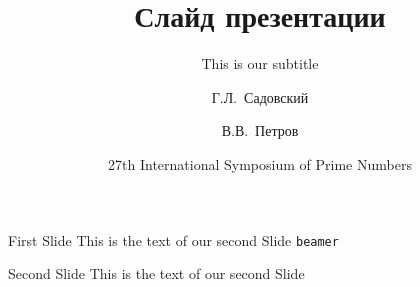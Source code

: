 \documentclass[10pt]{beamer}
\begin{document}
\title{Слайд презентации}
\subtitle{This is our subtitle }
\author[Садовский, Петров]
{Г.Л.~Садовский \and В.В.~Петров}

\date[ISPN ’80]{27th International Symposium of Prime Numbers}


    
\begin{frame}{}
\titlepage
\end{frame}

\begin{frame}[c]{First Slide}
    This is the text of our second Slide \texttt{beamer}
\end{frame}

\begin{frame}{Second Slide}
    This is the text of our second Slide
\end{frame}
\end{document}
